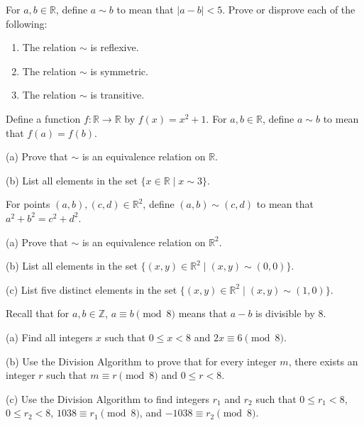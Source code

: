 \documentclass[11pt,paper=b5,footinclude,headinclude]{scrbook} %
\theoremstyle{remark}
\theoremstyle{definition} %
\theoremstyle{theorem} %
\newtheorem{ex}{Exercise\hypertarget{sol:\theex}}[chapter]
\begin{document}
\begin{ex}
For \( a, b \in \mathbb{R} \), define \( a \sim b \) to mean that \( |a - b| < 5 \). Prove or disprove each of the following:
\begin{enumerate}[label=\textit{(\alph*})]
    \item The relation \( \sim \) is reflexive.
    \item The relation \( \sim \) is symmetric.
    \item The relation \( \sim \) is transitive.
\end{enumerate}
\end{ex}

\begin{ex}
Define a function \( f : \mathbb{R} \to \mathbb{R} \) by \( f(x) = x^2 + 1 \). For \( a, b \in \mathbb{R} \), define \( a \sim b \) to mean that \( f(a) = f(b) \).

(a) Prove that \( \sim \) is an equivalence relation on \( \mathbb{R} \).

(b) List all elements in the set \( \{x \in \mathbb{R} \mid x \sim 3\} \).
\end{ex}

\begin{ex}
For points \( (a, b), (c, d) \in \mathbb{R}^2 \), define \( (a, b) \sim (c, d) \) to mean that \( a^2 + b^2 = c^2 + d^2 \).

(a) Prove that \( \sim \) is an equivalence relation on \( \mathbb{R}^2 \).

(b) List all elements in the set \( \{(x, y) \in \mathbb{R}^2 \mid (x, y) \sim (0, 0)\} \).

(c) List five distinct elements in the set \( \{(x, y) \in \mathbb{R}^2 \mid (x, y) \sim (1, 0)\} \).
\end{ex}

\begin{ex}
Recall that for \( a, b \in \mathbb{Z} \), \( a \equiv b \pmod{8} \) means that \( a - b \) is divisible by 8.

(a) Find all integers \( x \) such that \( 0 \leq x < 8 \) and \( 2x \equiv 6 \pmod{8} \).

(b) Use the Division Algorithm to prove that for every integer \( m \), there exists an integer \( r \) such that \( m \equiv r \pmod{8} \) and \( 0 \leq r < 8 \).

(c) Use the Division Algorithm to find integers \( r_1 \) and \( r_2 \) such that \( 0 \leq r_1 < 8 \), \( 0 \leq r_2 < 8 \), \( 1038 \equiv r_1 \pmod{8} \), and \( -1038 \equiv r_2 \pmod{8} \).
\end{ex}
\end{document}
